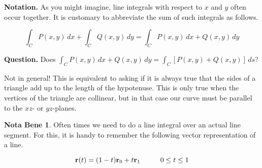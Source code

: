 \documentclass[11pt,oneside,english]{amsart}
\theoremstyle{definition}
\newtheorem*{note}{Nota Bene}
\newcommand{\pspace}{\hspace{10mm}}
\begin{document}
\pagebreak

\textbf{Notation.} As you might imagine, line integrals with respect to $x$ and $y$ often occur together. It is customary to abbreviate the sum of such integrals as follows.

\[
\int_CP(x,y)\,dx+\int_CQ(x,y)\,dy=\int_CP(x,y)\,dx+Q(x,y)\,dy
\]

\textbf{Question.} Does $\displaystyle \int_CP(x,y)\,dx+Q(x,y)\,dy=\int_C[P(x,y)+Q(x,y)]\,ds$?

Not in general! This is equivalent to asking if it is always true that the sides of a triangle add up to the length of the hypotenuse. This is only true when the vertices of the triangle are collinear, but in that case our curve must be parallel to the $xz$- or $yz$-planes.

\begin{note}
Often times we need to do a line integral over an actual line segment. For this, it is handy to remember the following vector representation of a line.

\[
\mathbf{r}(t)=(1-t)\mathbf{r}_0+t\mathbf{r}_1\pspace0\leq t\leq 1
\]
\end{note}
\end{document}
